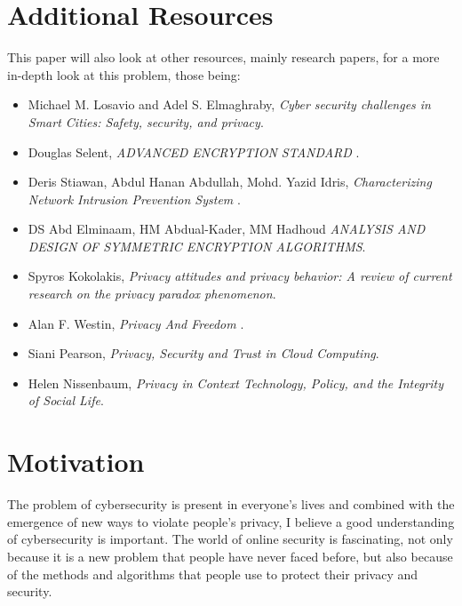 \documentclass[a4paper,12pt]{report}
\begin{document}
\section{Additional Resources}

This paper will also look at other resources, mainly research papers, for a more in-depth look at this problem, those being:

\begin{itemize}

\item Michael M. Losavio and Adel S. Elmaghraby, \textit{Cyber security challenges in Smart Cities: Safety, security, and privacy}. 

\item
Douglas Selent, \textit{ADVANCED ENCRYPTION STANDARD
}.

\item
Deris Stiawan, Abdul Hanan Abdullah, Mohd. Yazid Idris, \textit{Characterizing Network Intrusion Prevention System
}.

\item 
DS Abd Elminaam, HM Abdual-Kader, MM Hadhoud  \textit{ANALYSIS AND DESIGN OF
SYMMETRIC ENCRYPTION ALGORITHMS}.

\item 
Spyros Kokolakis, \textit{Privacy attitudes and privacy behavior: A review of current research on the privacy paradox phenomenon}.

\item
Alan F. Westin, \textit{Privacy And Freedom }.

\item
Siani Pearson, \textit{Privacy, Security and Trust in Cloud Computing}. 

\item
Helen Nissenbaum, \textit{Privacy in Context Technology, Policy, and the Integrity of Social Life}.


\end{itemize}

\section{Motivation}

The problem of cybersecurity is present in everyone's lives and combined with the emergence of new ways to violate people's privacy, I believe a good understanding of cybersecurity is important. The world of online security is fascinating, not only because it is a new problem that people have never faced before, but also because of the methods and algorithms that people use to protect their privacy and security.
\end{document}
